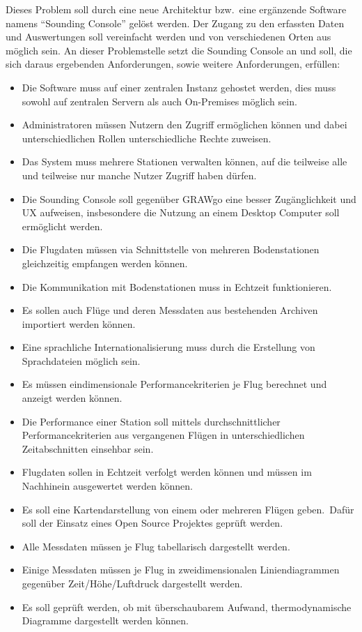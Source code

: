 Dieses Problem soll durch eine neue Architektur bzw.\ eine ergänzende Software namens \enquote{Sounding Console} gelöst werden.
Der Zugang zu den erfassten Daten und Auswertungen soll vereinfacht werden und von verschiedenen Orten aus möglich sein.
An dieser Problemstelle setzt die Sounding Console an und soll, die sich daraus ergebenden Anforderungen, sowie weitere Anforderungen, erfüllen:
\begin{itemize}
    \item Die Software muss auf einer zentralen Instanz gehostet werden, dies muss sowohl auf zentralen Servern als auch On-Premises möglich sein.
    \item Administratoren müssen Nutzern den Zugriff ermöglichen können und dabei unterschiedlichen Rollen unterschiedliche Rechte zuweisen.
    \item Das System muss mehrere Stationen verwalten können, auf die teilweise alle und teilweise nur manche Nutzer Zugriff haben dürfen.
    \item Die Sounding Console soll gegenüber GRAWgo eine besser Zugänglichkeit und UX aufweisen, insbesondere die Nutzung an einem Desktop Computer soll ermöglicht werden.
    \item Die Flugdaten müssen via Schnittstelle von mehreren Bodenstationen gleichzeitig empfangen werden können.
    \item Die Kommunikation mit Bodenstationen muss in Echtzeit funktionieren.
    \item Es sollen auch Flüge und deren Messdaten aus bestehenden Archiven importiert werden können.
    \item Eine sprachliche Internationalisierung muss durch die Erstellung von Sprachdateien möglich sein.
    \item Es müssen eindimensionale Performancekriterien je Flug berechnet und anzeigt werden können.
    \item Die Performance einer Station soll mittels durchschnittlicher Performancekriterien aus vergangenen Flügen in unterschiedlichen Zeitabschnitten einsehbar sein.
    \item Flugdaten sollen in Echtzeit verfolgt werden können und müssen im Nachhinein ausgewertet werden können.
    \item Es soll eine Kartendarstellung von einem oder mehreren Flügen geben.\ Dafür soll der Einsatz eines Open Source Projektes geprüft werden.
    \item Alle Messdaten müssen je Flug tabellarisch dargestellt werden.
    \item Einige Messdaten müssen je Flug in zweidimensionalen Liniendiagrammen gegenüber Zeit/Höhe/Luftdruck dargestellt werden.
    \item Es soll geprüft werden, ob mit überschaubarem Aufwand, thermodynamische Diagramme dargestellt werden können.
\end{itemize}

